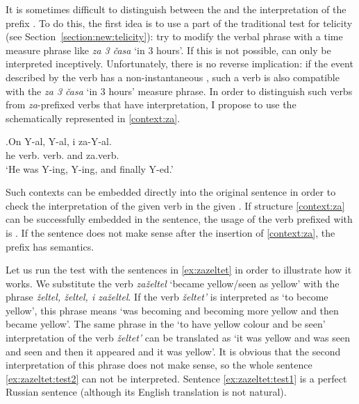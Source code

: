 It is sometimes difficult to distinguish between the  and the  interpretation of the prefix . To do this, the first idea is to use a part of the traditional test for telicity (see Section~\ref{section:new:telicity}): try to modify the verbal phrase with a time measure phrase like \textit{za 3 \v{c}asa} `in 3 hours'. If this is not possible, can only be interpreted inceptively. Unfortunately, there is no reverse implication: if the event described by the  verb has a non-instantaneous , such a verb is also compatible with the \textit{za 3 \v{c}asa} `in 3 hours' measure phrase. In order to distinguish such verbs from \textit{za}-prefixed verbs that have  interpretation, I propose to use the  schematically represented in \ref{context:za}.

\exg.\label{context:za}On Y-al, Y-al, i za-Y-al.\\
he verb. verb. and za.verb.\\
\trans `He was Y-ing, Y-ing, and finally Y-ed.'

Such contexts can be embedded directly into the original sentence in order to check the interpretation of the given verb in the given . If structure \ref{context:za} can be successfully embedded in the sentence, the usage of the verb prefixed with  is . If the sentence does not make sense after the insertion of  \ref{context:za}, the prefix  has  semantics.

Let us run the test with the sentences in \ref{ex:zazeltet} in order to illustrate how it works. We substitute the verb \textit{za\v{z}eltel} `became yellow/seen as yellow' with the phrase \textit{\v{z}eltel, \v{z}eltel, i za\v{z}eltel}. If the verb \textit{\v{z}eltet'} is interpreted as `to become yellow', this phrase means `was becoming and becoming more yellow and then became yellow'. The same phrase in the `to have yellow colour and be seen' interpretation of the verb \textit{\v{z}eltet'} can be translated as `it was yellow and was seen and seen and then it appeared and it was yellow'. It is obvious that the second interpretation of this phrase does not make sense, so the whole sentence \ref{ex:zazeltet:test2} can not be interpreted. Sentence \ref{ex:zazeltet:test1} is a perfect Russian sentence (although its English translation is not natural).

